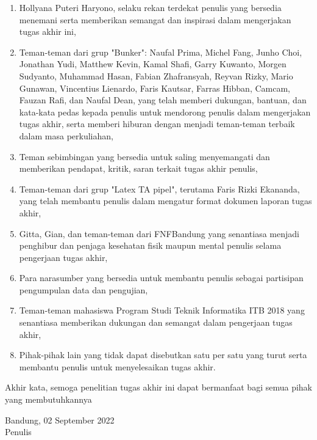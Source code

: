 \begin{enumerate}
  \item Hollyana Puteri Haryono, selaku rekan terdekat penulis yang bersedia menemani serta memberikan semangat dan inspirasi dalam mengerjakan tugas akhir ini,
  
  
  \item Teman-teman dari grup "Bunker": Naufal Prima, Michel Fang, Junho Choi, Jonathan Yudi, Matthew Kevin, Kamal Shafi, Garry Kuwanto, Morgen Sudyanto, Muhammad Hasan, Fabian Zhafransyah, Reyvan Rizky, Mario Gunawan, Vincentius Lienardo, Faris Kautsar, Farras Hibban, Camcam, Fauzan Rafi, dan Naufal Dean, yang telah memberi dukungan, bantuan, dan kata-kata pedas kepada penulis untuk mendorong penulis dalam mengerjakan tugas akhir, serta memberi hiburan dengan menjadi teman-teman terbaik dalam masa perkuliahan,
  
  \item Teman sebimbingan yang bersedia untuk saling menyemangati dan memberikan pendapat, kritik, saran terkait tugas akhir penulis,
  
  \item Teman-teman dari grup "Latex TA pipel", terutama Faris Rizki Ekananda, yang telah membantu penulis dalam mengatur format dokumen laporan tugas akhir,
  
  \item Gitta, Gian, dan teman-teman dari FNFBandung yang senantiasa menjadi penghibur dan penjaga kesehatan fisik maupun mental penulis selama pengerjaan tugas akhir,
  
  \item Para narasumber yang bersedia untuk membantu penulis sebagai partisipan pengumpulan data dan pengujian,

  \item Teman-teman mahasiswa Program Studi Teknik Informatika ITB 2018 yang senantiasa memberikan dukungan dan semangat dalam pengerjaan tugas akhir,
   
  \item Pihak-pihak lain yang tidak dapat disebutkan satu per satu yang turut serta membantu penulis untuk menyelesaikan tugas akhir.
   
\end{enumerate}

Akhir kata, semoga penelitian tugas akhir ini dapat bermanfaat bagi semua pihak yang membutuhkannya

\vspace{1mm}

\begin{flushright}
  Bandung, 02 September 2022 \\
  \vspace{2.5cm}
  Penulis
\end{flushright}
\vfill
